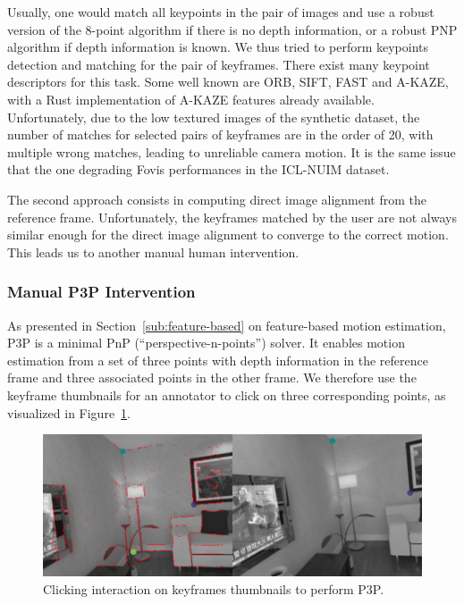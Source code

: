 Usually, one would match all keypoints in the pair of images
and use a robust version of the 8-point algorithm if there is no depth information,
or a robust PNP algorithm if depth information is known.
We thus tried to perform keypoints detection and matching for the pair of keyframes.
There exist many keypoint descriptors for this task.
Some well known are ORB, SIFT, FAST and A-KAZE,
with a Rust implementation of A-KAZE features already available.
Unfortunately, due to the low textured images of the synthetic dataset,
the number of matches for selected pairs of keyframes are in the order of 20,
with multiple wrong matches, leading to unreliable camera motion.
It is the same issue that the one degrading Fovis performances in the ICL-NUIM dataset.

The second approach consists in computing direct image alignment from the reference frame.
Unfortunately, the keyframes matched by the user are not always similar enough
for the direct image alignment to converge to the correct motion.
This leads us to another manual human intervention.

\subsubsection{Manual P3P Intervention}%

As presented in Section~\ref{sub:feature-based} on feature-based motion estimation,
P3P is a minimal PnP (``perspective-n-points'') solver.
It enables motion estimation from a set of three points with depth information
in the reference frame and three associated points in the other frame.
We therefore use the keyframe thumbnails for an annotator to click on three
corresponding points, as visualized in Figure~\ref{fig:p3p}.

\begin{figure}[ht]
	\centering
	\includegraphics[width=\linewidth]{assets/img/p3p.png}
	\caption{Clicking interaction on keyframes thumbnails to perform P3P.}%
	\label{fig:p3p}
\end{figure}

